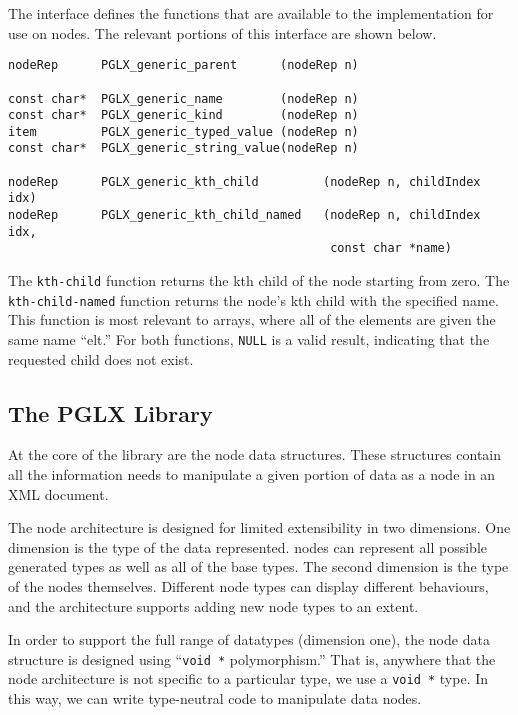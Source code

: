\documentclass{article}
\begin{document}
The \pglx interface defines the functions that are available to the
\pads \dm implementation for use on nodes. The relevant portions of
this interface are shown below.
\begin{verbatim}
nodeRep      PGLX_generic_parent      (nodeRep n)

const char*  PGLX_generic_name        (nodeRep n)
const char*  PGLX_generic_kind        (nodeRep n)
item         PGLX_generic_typed_value (nodeRep n)
const char*  PGLX_generic_string_value(nodeRep n)

nodeRep      PGLX_generic_kth_child         (nodeRep n, childIndex idx)
nodeRep      PGLX_generic_kth_child_named   (nodeRep n, childIndex idx, 
                                             const char *name)
\end{verbatim}

The {\tt kth-child} function returns the kth child of the node
starting from zero. The {\tt kth-child-named} function returns the node's kth
child with the specified name. This function is most relevant to
arrays, where all of the elements are given the same name ``elt.''
For both functions, {\tt NULL} is a valid result, indicating that the
requested child does not exist.

\subsection{The PGLX Library}
\label{sec:pglx-lib}

At the core of the \pglx library are the node data structures. These
structures contain all the information \galax needs to manipulate a
given portion of \pads data as a node in an XML document.

The node architecture is designed for limited extensibility in two
dimensions. One dimension is the type of the data represented. \pads
nodes can represent all possible generated \pads types as well as all
of the \pads base types. The second dimension is the type of the nodes
themselves. Different node types can display different behaviours, and
the architecture supports adding new node types to an extent.

In order to support the full range of \pads datatypes (dimension one),
the node data structure is designed using ``{\tt void *}
polymorphism.'' That is, anywhere that the node architecture is not
specific to a particular type, we use a {\tt void *} type. In this
way, we can write type-neutral code to manipulate data nodes.
\end{document}

